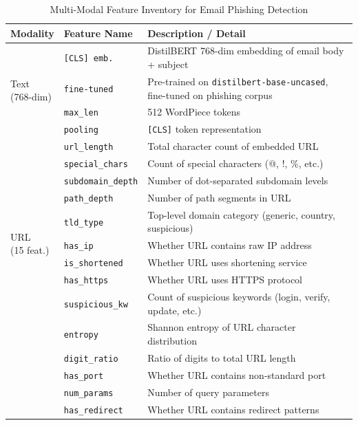 \documentclass[conference]{IEEEtran}
\begin{document}
\begin{table}[t]
\centering
\caption{Multi-Modal Feature Inventory for Email Phishing Detection}
\label{tab:feature_engineering}
\renewcommand{\arraystretch}{1.1}
\begin{tabular}{p{1.3cm} p{1.8cm} p{4.4cm}}
\toprule
\textbf{Modality} & \textbf{Feature Name} & \textbf{Description / Detail} \\
\midrule
\multirow{4}{*}{\parbox{1.3cm}{Text\\(768-dim)}}
  & \texttt{[CLS] emb.} & DistilBERT 768-dim embedding of email body + subject \\
  & \texttt{fine-tuned} & Pre-trained on \texttt{distilbert-base-uncased}, fine-tuned on phishing corpus \\
  & \texttt{max\_len} & 512 WordPiece tokens \\
  & \texttt{pooling} & \texttt{[CLS]} token representation \\
  \midrule
\multirow{10}{*}{\parbox{1.3cm}{URL\\(15 feat.)}}
  & \texttt{url\_length} & Total character count of embedded URL \\
  & \texttt{special\_chars} & Count of special characters (@, !, \%, etc.) \\
  & \texttt{subdomain\_depth} & Number of dot-separated subdomain levels \\
  & \texttt{path\_depth} & Number of path segments in URL \\
  & \texttt{tld\_type} & Top-level domain category (generic, country, suspicious) \\
  & \texttt{has\_ip} & Whether URL contains raw IP address \\
  & \texttt{is\_shortened} & Whether URL uses shortening service \\
  & \texttt{has\_https} & Whether URL uses HTTPS protocol \\
  & \texttt{suspicious\_kw} & Count of suspicious keywords (login, verify, update, etc.) \\
  & \texttt{entropy} & Shannon entropy of URL character distribution \\
  & \texttt{digit\_ratio} & Ratio of digits to total URL length \\
  & \texttt{has\_port} & Whether URL contains non-standard port \\
  & \texttt{num\_params} & Number of query parameters \\
  & \texttt{has\_redirect} & Whether URL contains redirect patterns \\

\end{tabular}
\end{table}
\end{document}
